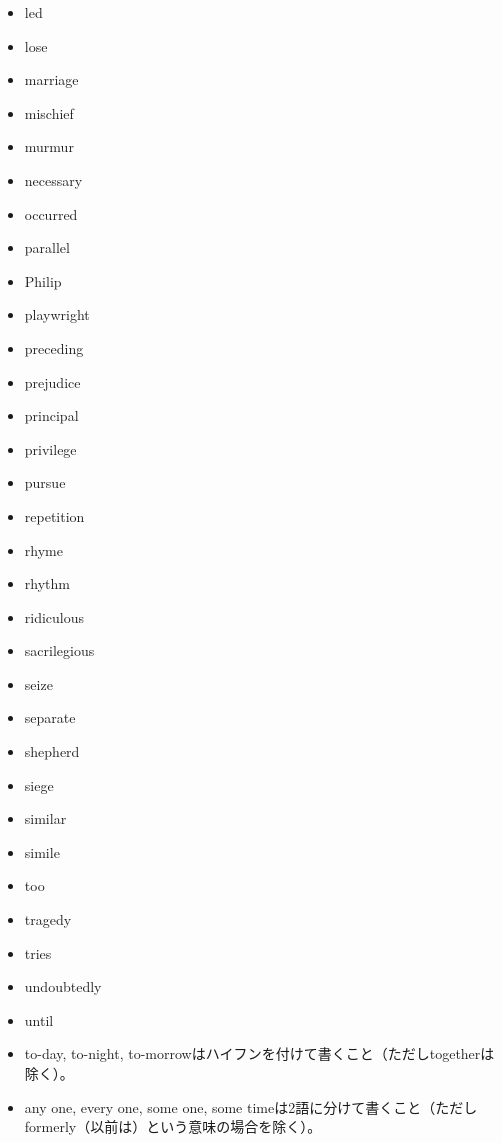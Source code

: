 \begin{itemize}
\item led

\item lose

\item marriage

\item mischief

\item murmur

\item necessary

\item occurred

\item parallel

\item Philip

\item playwright

\item preceding

\item prejudice

\item principal

\item privilege

\item pursue

\item repetition

\item rhyme

\item rhythm

\item ridiculous

\item sacrilegious

\item seize

\item separate

\item shepherd

\item siege

\item similar

\item simile

\item too

\item tragedy

\item tries

\item undoubtedly

\item until

\item to-day, to-night,
to-morrowはハイフンを付けて書くこと（ただしtogetherは除く）。

\item any one, every one, some one, some
timeは2語に分けて書くこと（ただしformerly（以前は）という意味の場合を除く）。
\end{itemize}
